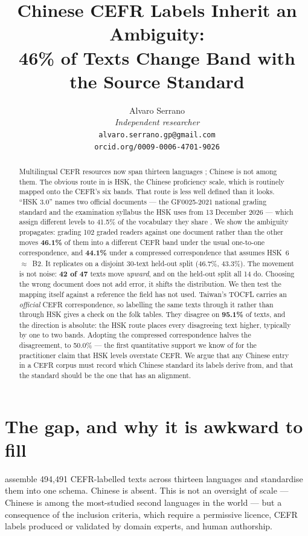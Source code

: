 \documentclass[11pt]{article}
\title{Chinese CEFR Labels Inherit an Ambiguity:\\
46\% of Texts Change Band with the Source Standard}
\author{Alvaro Serrano \\
  \textit{Independent researcher} \\
  \texttt{alvaro.serrano.gp@gmail.com} \\
  \texttt{orcid.org/0009-0006-4701-9026}}
\begin{document}
\maketitle

\begin{abstract}
Multilingual CEFR resources now span thirteen languages
\citep{imperial2025universalcefr}; Chinese is not among them. The obvious route
in is HSK, the Chinese proficiency scale, which is routinely mapped onto the
CEFR's six bands. That route is less well defined than it looks. ``HSK 3.0''
names two official documents --- the GF0025-2021 national grading standard and
the examination syllabus the HSK uses from 13 December 2026 --- which assign different
levels to 41.5\% of the vocabulary they share \citep{serrano2026whichhsk}. We
show the ambiguity propagates: grading 102 graded readers against one document
rather than the other moves \textbf{46.1\%} of them into a different CEFR band
under the usual one-to-one correspondence, and \textbf{44.1\%} under a
compressed correspondence that assumes HSK~6~$\approx$~B2. It replicates on a
disjoint 30-text held-out split (46.7\%, 43.3\%). The movement is not noise:
\textbf{42 of 47} texts move \emph{upward}, and on the held-out split all 14
do. Choosing the wrong document does not add error, it shifts the distribution.
We then test the mapping itself against a reference the field has not used.
Taiwan's TOCFL carries an \emph{official} CEFR correspondence, so labelling the
same texts through it rather than through HSK gives a check on the folk tables.
They disagree on \textbf{95.1\%} of texts, and the direction is absolute: the
HSK route places every disagreeing text higher, typically by one to two bands.
Adopting the compressed correspondence halves the disagreement, to 50.0\% ---
the first quantitative support we know of for the practitioner claim that HSK
levels overstate CEFR. We argue that any Chinese entry in a CEFR corpus must
record which Chinese standard its labels derive from, and that the standard
should be the one that has an alignment.
\end{abstract}

\section{The gap, and why it is awkward to fill}

\citet{imperial2025universalcefr} assemble 494{,}491 CEFR-labelled texts across
thirteen languages and standardise them into one schema. Chinese is absent.
This is not an oversight of scale --- Chinese is among the most-studied second
languages in the world --- but a consequence of the inclusion criteria, which
require a permissive licence, CEFR labels produced or validated by domain
experts, and human authorship.
\end{document}
